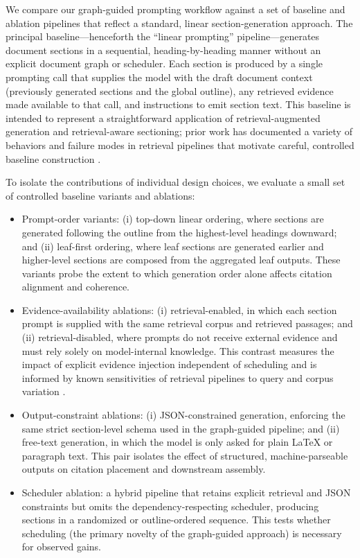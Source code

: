 We compare our graph-guided prompting workflow against a set of baseline and ablation pipelines that reflect a standard, linear section-generation approach. The principal baseline—henceforth the ``linear prompting'' pipeline—generates document sections in a sequential, heading-by-heading manner without an explicit document graph or scheduler. Each section is produced by a single prompting call that supplies the model with the draft document context (previously generated sections and the global outline), any retrieved evidence made available to that call, and instructions to emit section text. This baseline is intended to represent a straightforward application of retrieval-augmented generation and retrieval-aware sectioning; prior work has documented a variety of behaviors and failure modes in retrieval pipelines that motivate careful, controlled baseline construction \cite{web_penha_2021_evaluating_the_robustness_of_retrieval_pipelines,web_penha_2023_do_the_findings_of_document_and_passage_retrieva}. 

To isolate the contributions of individual design choices, we evaluate a small set of controlled baseline variants and ablations:

\begin{itemize}
  \item Prompt-order variants: (i) top-down linear ordering, where sections are generated following the outline from the highest-level headings downward; and (ii) leaf-first ordering, where leaf sections are generated earlier and higher-level sections are composed from the aggregated leaf outputs. These variants probe the extent to which generation order alone affects citation alignment and coherence.
  \item Evidence-availability ablations: (i) retrieval-enabled, in which each section prompt is supplied with the same retrieval corpus and retrieved passages; and (ii) retrieval-disabled, where prompts do not receive external evidence and must rely solely on model-internal knowledge. This contrast measures the impact of explicit evidence injection independent of scheduling and is informed by known sensitivities of retrieval pipelines to query and corpus variation \cite{web_penha_2021_evaluating_the_robustness_of_retrieval_pipelines}.
  \item Output-constraint ablations: (i) JSON-constrained generation, enforcing the same strict section-level schema used in the graph-guided pipeline; and (ii) free-text generation, in which the model is only asked for plain LaTeX or paragraph text. This pair isolates the effect of structured, machine-parseable outputs on citation placement and downstream assembly.
  \item Scheduler ablation: a hybrid pipeline that retains explicit retrieval and JSON constraints but omits the dependency-respecting scheduler, producing sections in a randomized or outline-ordered sequence. This tests whether scheduling (the primary novelty of the graph-guided approach) is necessary for observed gains.
\end{itemize}

